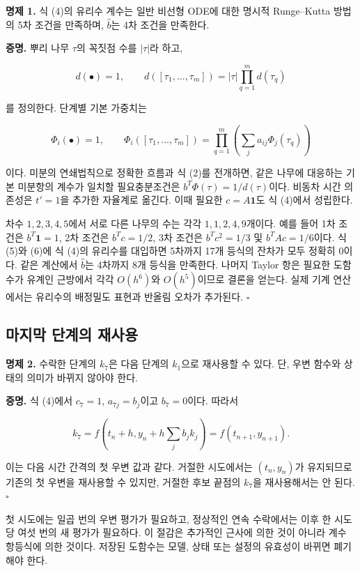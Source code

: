 \documentclass[
  10pt,
  dvipsnames]{article}
\begin{document}
\textbf{명제 1.} 식 (4)의 유리수 계수는 일반 비선형 ODE에 대한 명시적
Runge--Kutta 방법의 5차 조건을 만족하며, \(\widehat b\)는 4차 조건을
만족한다.

\textbf{증명.} 뿌리 나무 \(\tau\)의 꼭짓점 수를 \(|\tau|\)라 하고,

\[
 d(\bullet)=1,\qquad
 d([\tau_1,\ldots,\tau_m])=|\tau|\prod_{q=1}^m d(\tau_q)
 \tag{5}
\]

를 정의한다. 단계별 기본 가중치는

\[
 \Phi_i(\bullet)=1,\qquad
 \Phi_i([\tau_1,\ldots,\tau_m])
 =\prod_{q=1}^m\left(\sum_j a_{ij}\Phi_j(\tau_q)\right)
 \tag{6}
\]

이다. 미분의 연쇄법칙으로 정확한 흐름과 식 (2)를 전개하면, 같은 나무에
대응하는 기본 미분항의 계수가 일치할 필요충분조건은
\(b^T\Phi(\tau)=1/d(\tau)\)이다. 비동차 시간 의존성은 \(t'=1\)을 추가한
자율계로 옮긴다. 이때 필요한 \(c=A\mathbf1\)도 식 (4)에서 성립한다.

차수 \(1,2,3,4,5\)에서 서로 다른 나무의 수는 각각 \(1,1,2,4,9\)개이다.
예를 들어 1차 조건은 \(b^T\mathbf1=1\), 2차 조건은 \(b^Tc=1/2\), 3차
조건은 \(b^Tc^2=1/3\) 및 \(b^TAc=1/6\)이다. 식 (5)와 (6)에 식 (4)의
유리수를 대입하면 5차까지 17개 등식의 잔차가 모두 정확히 0이다. 같은
계산에서 \(\widehat b\)는 4차까지 8개 등식을 만족한다. 나머지 Taylor
항은 필요한 도함수가 유계인 근방에서 각각 \(O(h^6)\)와 \(O(h^5)\)이므로
결론을 얻는다. 실제 기계 연산에서는 유리수의 배정밀도 표현과 반올림
오차가 추가된다. \(\square\)

\hypertarget{uxb9c8uxc9c0uxb9c9-uxb2e8uxacc4uxc758-uxc7acuxc0acuxc6a9}{%
\subsection{마지막 단계의
재사용}\label{uxb9c8uxc9c0uxb9c9-uxb2e8uxacc4uxc758-uxc7acuxc0acuxc6a9}}

\textbf{명제 2.} 수락한 단계의 \(k_7\)은 다음 단계의 \(k_1\)으로
재사용할 수 있다. 단, 우변 함수와 상태의 의미가 바뀌지 않아야 한다.

\textbf{증명.} 식 (4)에서 \(c_7=1\), \(a_{7j}=b_j\)이고 \(b_7=0\)이다.
따라서

\[
 k_7=f\!\left(t_n+h,y_n+h\sum_jb_jk_j\right)
     =f(t_{n+1},y_{n+1}).
 \tag{7}
\]

이는 다음 시간 간격의 첫 우변 값과 같다. 거절한 시도에서는
\((t_n,y_n)\)가 유지되므로 기존의 첫 우변을 재사용할 수 있지만, 거절한
후보 끝점의 \(k_7\)을 재사용해서는 안 된다. \(\square\)

첫 시도에는 일곱 번의 우변 평가가 필요하고, 정상적인 연속 수락에서는
이후 한 시도당 여섯 번의 새 평가가 필요하다. 이 절감은 추가적인 근사에
의한 것이 아니라 계수 항등식에 의한 것이다. 저장된 도함수는 모델, 상태
또는 설정의 유효성이 바뀌면 폐기해야 한다.
\end{document}
